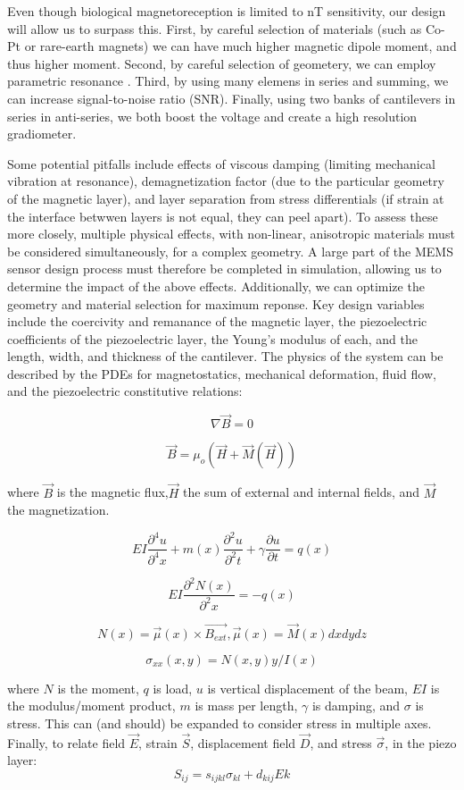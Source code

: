  Even though biological magnetoreception is limited to nT sensitivity, our design will allow us to surpass this. First, by careful selection of materials (such as Co-Pt or rare-earth magnets) \cite{coey2010magnetism, arnold2009permanent} we can have much higher magnetic dipole moment, and thus higher moment. Second, by careful selection of geometery, we can employ parametric resonance \cite{van2006resonant}. Third, by using many elemens in series and summing, we can increase signal-to-noise ratio (SNR). Finally, using two banks of cantilevers in series in anti-series, we both boost the voltage and create a high resolution gradiometer.

 Some potential pitfalls include effects of viscous damping (limiting mechanical vibration at resonance), demagnetization factor (due to the particular geometry of the magnetic layer), and layer separation from stress differentials (if strain at the interface betwwen layers is not equal, they can peel apart). To assess these more closely, multiple physical effects, with non-linear, anisotropic materials must be considered simultaneously, for a complex geometry. A large part of the MEMS sensor design process must therefore be completed in simulation, allowing us to determine the impact of the above effects. Additionally, we can optimize the geometry and material selection for maximum reponse. Key design variables include the coercivity and remanance of the magnetic layer, the piezoelectric coefficients of the piezoelectric layer, the Young's modulus of each, and the length, width, and thickness of the cantilever. The physics of the system can be described by the PDEs for magnetostatics, mechanical deformation, fluid flow, and the piezoelectric constitutive relations:

 $$ \nabla \vec{B} = 0$$

 $$ \vec{B} = \mu_o(\vec{H}+\vec{M}(\vec{H}))$$

where $\vec{B}$ is the magnetic flux,$\vec{H}$ the sum of external and internal fields, and $\vec{M}$ the magnetization.
 
 $$ EI\frac{\partial^4u}{\partial^4x}+m(x)\frac{\partial^2u}{\partial^2t}+\gamma\frac{\partial u}{\partial t}=q(x)$$

 $$ EI\frac{\partial^2N(x)}{\partial^2x} = -q(x)$$
 
$$ N(x) = \vec{\mu}(x) \times \vec{B_{ext}}, \vec{\mu}(x) = \vec{M}(x)dxdydz $$

$$\sigma_{xx}(x,y)  = N(x,y)y/I(x)$$

where $N$ is the moment, $q$ is load, $u$ is vertical displacement of the beam, $EI$ is the modulus/moment product, $m$ is mass per length, $\gamma$ is damping, and $\sigma$ is stress. This can (and should) be expanded to consider stress in multiple axes.
Finally, to relate field $\vec{E}$, strain $\vec{S}$, displacement field $\vec{D}$, and stress $\vec{\sigma}$, in the piezo layer:
 $$S_{ij} = s_{ijkl}\sigma_{kl}+d_{kij}E{k}$$

